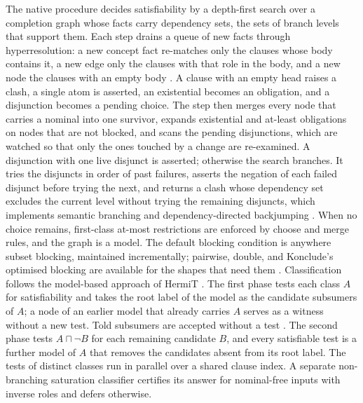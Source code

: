 The native procedure decides satisfiability by a depth-first search over a
completion graph whose facts carry dependency sets, the sets of branch levels
that support them.  Each step drains a queue of new facts through
hyperresolution: a new concept fact re-matches only the clauses whose body
contains it, a new edge only the clauses with that role in the body, and a new
node the clauses with an empty body \cite{motik2007opt}.  A clause with an
empty head raises a clash, a single atom is asserted, an existential becomes
an obligation, and a disjunction becomes a pending choice.  The step then
merges every node that carries a nominal into one survivor, expands
existential and at-least obligations on nodes that are not blocked, and scans
the pending disjunctions, which are watched so that only the ones touched by
a change are re-examined.  A disjunction with one live disjunct is asserted;
otherwise the search branches.  It tries the disjuncts in order of past
failures, asserts the negation of each failed disjunct before trying the
next, and returns a clash whose dependency set excludes the current level
without trying the remaining disjuncts, which implements semantic branching and
dependency-directed backjumping \cite{horrocks1999optimizing}.  When no choice
remains, first-class at-most restrictions are enforced by choose and merge
rules, and the graph is a model.  The default blocking condition is anywhere
subset blocking, maintained incrementally; pairwise, double, and Konclude's
optimised blocking are available for the shapes that need them
\cite{horrocks1999practical,steigmiller2016thesis}.  Classification follows
the model-based approach of HermiT \cite{glimm2012novel}.  The first phase tests
each class $A$ for satisfiability and takes the root label of the model as the
candidate subsumers of $A$; a node of an earlier model that already carries $A$
serves as a witness without a new test.  Told subsumers are accepted without a
test \cite{baader1994empirical}.  The second phase tests $A\sqcap\neg B$ for each
remaining candidate $B$, and every satisfiable test is a further model of $A$
that removes the candidates absent from its root label.  The tests of distinct
classes run in parallel over a shared clause index.  A separate non-branching
saturation classifier certifies its answer for nominal-free inputs with inverse
roles and defers otherwise.

